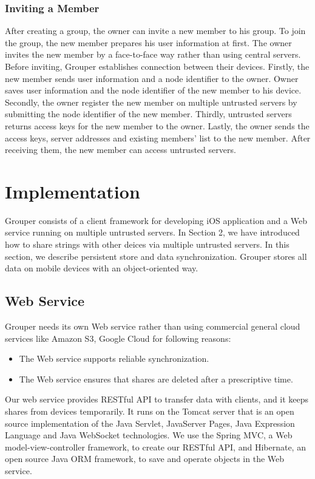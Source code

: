 \documentclass[twocolumn,10pt]{article}
\begin{document}
\subsubsection{Inviting a Member}

After creating a group, the owner can invite a new member to his group. To join the group, the new member prepares his user information at first. The owner invites the new member by a face-to-face way rather than using central servers. Before inviting, Grouper establishes connection between their devices. Firstly, the new member sends user information and a node identifier to the owner. Owner saves user information and the node identifier of the new member to his device. Secondly, the owner register the new member on multiple untrusted servers by submitting the node identifier of the new member. Thirdly, untrusted servers returns access keys for the new member to the owner. Lastly, the owner sends the access keys, server addresses and existing members' list to the new member. After receiving them, the new member can access untrusted servers.

\section{Implementation}

Grouper consists of a client framework for developing iOS application and a Web service running on multiple untrusted servers. In Section 2, we have introduced how to share strings with other deices via multiple untrusted servers. In this section, we describe persistent store and data synchronization. Grouper stores all data on mobile devices with an object-oriented way.

\subsection{Web Service}
Grouper needs its own Web service rather than using commercial general cloud services like Amazon S3, Google Cloud for following reasons:

\begin{itemize}
	\setlength{\itemsep}{1pt}
	\setlength{\parskip}{0pt}
	\setlength{\parsep}{0pt}
	\item The Web service supports reliable synchronization.
	\item The Web service ensures that shares are deleted after a prescriptive time.
\end{itemize}

Our web service provides RESTful API to transfer data with clients, and it keeps shares from devices temporarily. It runs on the Tomcat server that is an open source implementation of the Java Servlet, JavaServer Pages, Java Expression Language and Java WebSocket technologies. We use the Spring MVC, a  Web model-view-controller framework, to create our RESTful API, and Hibernate, an open source Java ORM framework, to save and operate objects in the Web service. 
\end{document}
